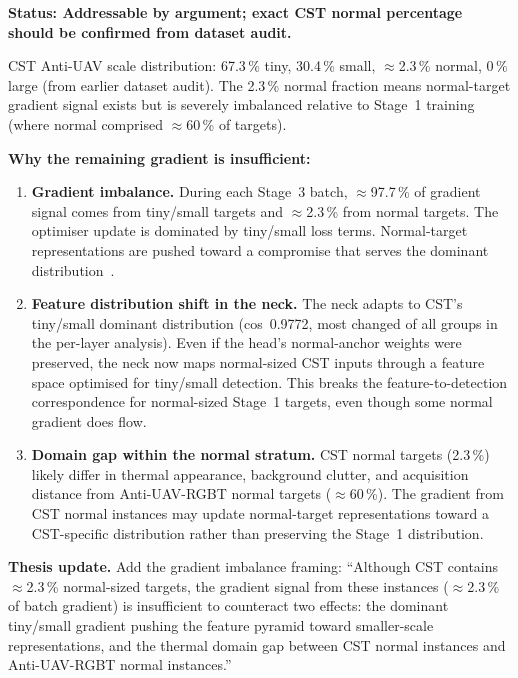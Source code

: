 \textbf{Status: Addressable by argument; exact CST normal percentage
should be confirmed from dataset audit.}

\vspace{0.5em}
\noindent CST Anti-UAV scale distribution: 67.3\,\% tiny, 30.4\,\% small,
$\approx$2.3\,\% normal, 0\,\% large (from earlier dataset audit). The
2.3\,\% normal fraction means normal-target gradient signal exists but is
severely imbalanced relative to Stage~1 training (where normal comprised
$\approx$60\,\% of targets).

\vspace{0.5em}
\noindent\textbf{Why the remaining gradient is insufficient:}
\begin{enumerate}
    \item \textbf{Gradient imbalance.} During each Stage~3 batch, $\approx$97.7\,\%
    of gradient signal comes from tiny/small targets and $\approx$2.3\,\% from
    normal targets. The optimiser update is dominated by tiny/small loss terms.
    Normal-target representations are pushed toward a compromise that serves
    the dominant distribution~\cite{molahasani2023continual,he2024gradientreweighting}.
    \item \textbf{Feature distribution shift in the neck.} The neck adapts to
    CST's tiny/small dominant distribution (cos~0.9772, most changed of all
    groups in the per-layer analysis). Even if the head's normal-anchor weights
    were preserved, the neck now maps normal-sized CST inputs through a feature
    space optimised for tiny/small detection. This breaks the feature-to-detection
    correspondence for normal-sized Stage~1 targets, even though some normal
    gradient does flow.
    \item \textbf{Domain gap within the normal stratum.} CST normal targets
    (2.3\,\%) likely differ in thermal appearance, background clutter, and
    acquisition distance from Anti-UAV-RGBT normal targets ($\approx$60\,\%).
    The gradient from CST normal instances may update normal-target representations
    toward a CST-specific distribution rather than preserving the Stage~1
    distribution.
\end{enumerate}

\noindent\textbf{Thesis update.} Add the gradient imbalance framing:
``Although CST contains $\approx$2.3\,\% normal-sized targets, the
gradient signal from these instances ($\approx$2.3\,\% of batch
gradient) is insufficient to counteract two effects: the dominant
tiny/small gradient pushing the feature pyramid toward smaller-scale
representations, and the thermal domain gap between CST normal
instances and Anti-UAV-RGBT normal instances.''

